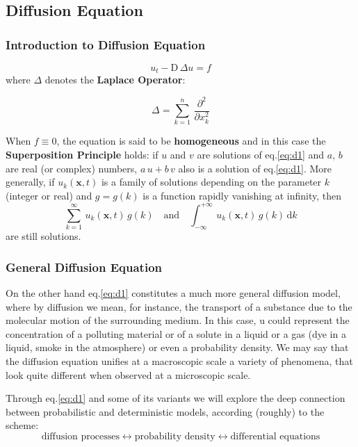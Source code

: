 \documentclass[../main.tex]{subfiles}
\begin{document}
\subsection{Diffusion Equation}

\subsubsection{Introduction to Diffusion Equation}

\begin{equation}
    u_t - \mathrm{D} \, \Delta u = f \label{eq:d1}
\end{equation}
where $\Delta$ denotes the \textbf{Laplace Operator}:

\begin{equation}
    \Delta = \sum_{k=1}^n \, \frac{\partial^2}{\partial x_k^2} \label{eq:d2}
\end{equation}

When $f \equiv 0$, the equation is said to be \textbf{homogeneous} and in this case the \textbf{Superposition Principle} holds: if $u$ and $v$ are solutions of eq.\ref{eq:d1} and $a$, $b$ are real (or complex) numbers, $a \, u + b \, v$ also is a solution of eq.\ref{eq:d1}. More generally, if $u_k(\mathbf{x}, t)$ is a family of solutions depending on the parameter $k$ (integer or real) and $g = g(k)$ is a function rapidly vanishing at infinity, then
\begin{equation*}
    \sum_{k=1}^{\infty} \, u_k(\mathbf{x}, t) \, g(k) \quad \text{and} \quad \int_{- \infty}^{+ \infty} \, u_k(\mathbf{x}, t) \, g(k) \, \mathrm{d} k
\end{equation*}
are still solutions.

\subsubsection{General Diffusion Equation}

On the other hand eq.\ref{eq:d1} constitutes a much more general diffusion model, where by diffusion we mean, for instance, the transport of a substance due to the molecular motion of the surrounding medium. In this case, u could represent the concentration of a polluting material or of a solute in a liquid or a gas (dye in a liquid, smoke in the atmosphere) or even a probability density. We may say that the diffusion equation unifies at a macroscopic scale a variety of phenomena, that look quite different when observed at a microscopic scale.

Through eq.\ref{eq:d1} and some of its variants we will explore the deep connection between probabilistic and deterministic models, according (roughly) to the scheme:
\begin{equation*}
    \text{diffusion processes} \leftrightarrow \text{probability density} \leftrightarrow \text{differential equations}
\end{equation*}
\end{document}

